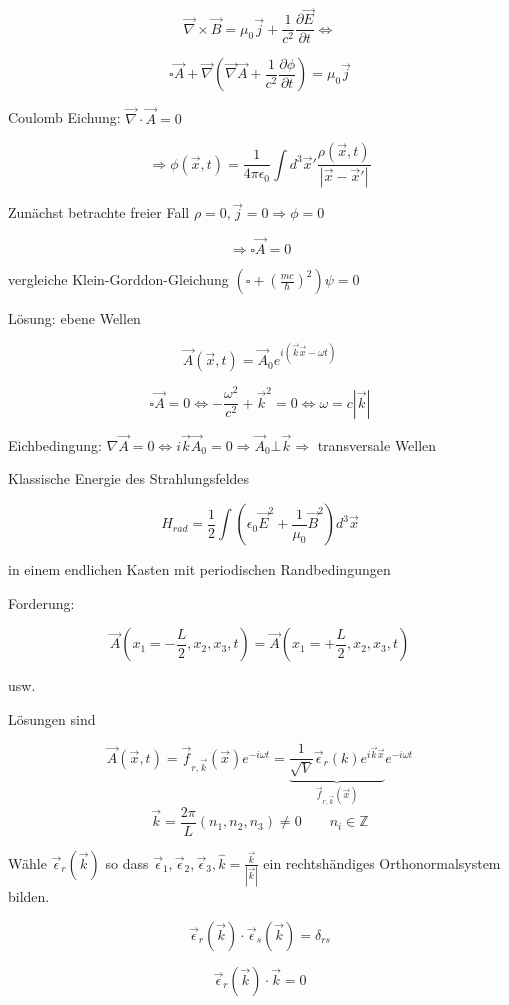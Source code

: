 \[\vec \nabla\times\vec B = \mu_0\vec j + \frac{1}{c^2}\frac{\partial\vec E}{\partial t} \Leftrightarrow  \]

\[\square \vec A + \vec\nabla(\vec\nabla\vec A + \frac{1}{c^2} \frac{\partial\phi}{\partial t}) = \mu_0 \vec j\]


Coulomb Eichung: \(\vec \nabla\cdot\vec A = 0\)

\[\Rightarrow \phi(\vec x,t) = \frac{1}{4\pi\epsilon_0}\int d^3\vec x' \frac{\rho(\vec x, t)}{|\vec x - \vec x'|}\]


Zunächst betrachte freier Fall \(\rho =0,\vec j = 0\Rightarrow \phi=0 \)

\[\Rightarrow  \boxed{\square \vec A = 0} \]

vergleiche Klein-Gorddon-Gleichung \( \left(\square +\left(\frac{mc}{\hbar}\right)^2\right)\psi = 0 \)

Lösung: ebene Wellen

\[\vec A(\vec x,t) = \vec A_0 e^{i(\vec k\vec x - \omega t)}\]


\[\square \vec A = 0 \Leftrightarrow  -\frac{\omega^2}{c^2}+\vec k^2 = 0\Leftrightarrow \omega = c|\vec k| \]


Eichbedingung: \(\nabla\vec A = 0 \Leftrightarrow i\vec k\vec A_0 = 0 \Rightarrow \vec A_0 \bot \vec k \Rightarrow  \) transversale Wellen

Klassische Energie des Strahlungsfeldes

\[H_{rad} = \frac{1}{2}\int (\epsilon_0\vec E ^2 + \frac{1}{\mu_0}\vec B^2)d^3\vec x\]

in einem endlichen Kasten mit periodischen Randbedingungen

Forderung:

\[\vec A(x_1 = -\frac{L}{2},x_2,x_3,t) = \vec A(x_1 =+\frac{L}{2},x_2,x_3,t) \]

usw.

Lösungen sind

\[\vec A(\vec x,t) = \vec f_{r,\vec k}(\vec x)e^{-i\omega t} = \underbrace{\frac{1}{\sqrt{V}}\vec \epsilon_r(k) e^{i\vec k\vec x} }_{\vec f_{r,\vec k}(\vec x) }e^{-i\omega t} \]
\[\vec k = \frac{2\pi}{L}(n_1,n_2,n_3)\neq 0\qquad n_i\in \mathbb Z\]


Wähle \(\vec \epsilon_r(\vec k)\) so dass \(\vec \epsilon_1, \vec \epsilon_2,\vec \epsilon_3,\hat k = \frac{\vec k}{|\vec k|}\) ein rechtshändiges Orthonormalsystem bilden.

\[\vec \epsilon_r(\vec k)\cdot \vec \epsilon_s(\vec k) = \delta_{rs}\]

\[ \vec \epsilon_r(\vec k)\cdot \vec k = 0 \]

